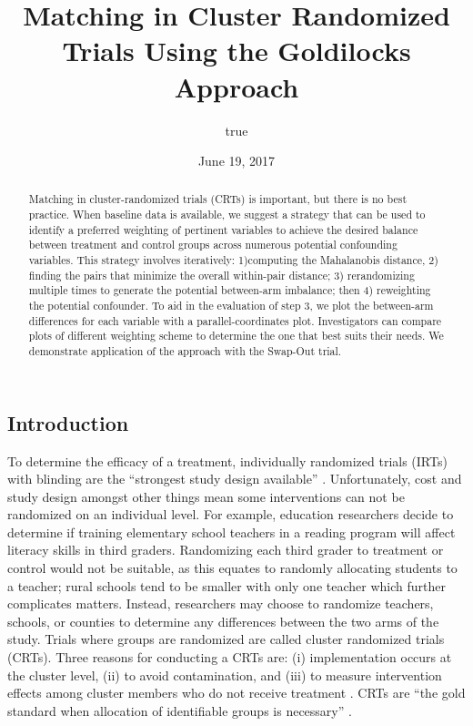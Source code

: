 \documentclass[]{sagej}
\title{Matching in Cluster Randomized Trials Using the Goldilocks Approach}
\author{true}
\date{June 19, 2017}
\begin{document}
\maketitle
\begin{abstract}
Matching in cluster-randomized trials (CRTs) is important, but there is
no best practice. When baseline data is available, we suggest a strategy
that can be used to identify a preferred weighting of pertinent
variables to achieve the desired balance between treatment and control
groups across numerous potential confounding variables. This strategy
involves iteratively: 1)computing the Mahalanobis distance, 2) finding
the pairs that minimize the overall within-pair distance; 3)
rerandomizing multiple times to generate the potential between-arm
imbalance; then 4) reweighting the potential confounder. To aid in the
evaluation of step 3, we plot the between-arm differences for each
variable with a parallel-coordinates plot. Investigators can compare
plots of different weighting scheme to determine the one that best suits
their needs. We demonstrate application of the approach with the
Swap-Out trial.
\end{abstract}

\subsection{Introduction}\label{introduction}

To determine the efficacy of a treatment, individually randomized trials
(IRTs) with blinding are the ``strongest study design available''
\citep{gatsonis2017methods}. Unfortunately, cost and study design
amongst other things mean some interventions can not be randomized on an
individual level. For example, education researchers decide to determine
if training elementary school teachers in a reading program will affect
literacy skills in third graders. Randomizing each third grader to
treatment or control would not be suitable, as this equates to randomly
allocating students to a teacher; rural schools tend to be smaller with
only one teacher which further complicates matters. Instead, researchers
may choose to randomize teachers, schools, or counties to determine any
differences between the two arms of the study. Trials where groups are
randomized are called cluster randomized trials (CRTs). Three reasons
for conducting a CRTs are: (i) implementation occurs at the cluster
level, (ii) to avoid contamination, and (iii) to measure intervention
effects among cluster members who do not receive treatment
\citep{balzer2012match, CRTrials2009}. CRTs are ``the gold standard when
allocation of identifiable groups is necessary''
\citep{murray2004design}.
\end{document}
